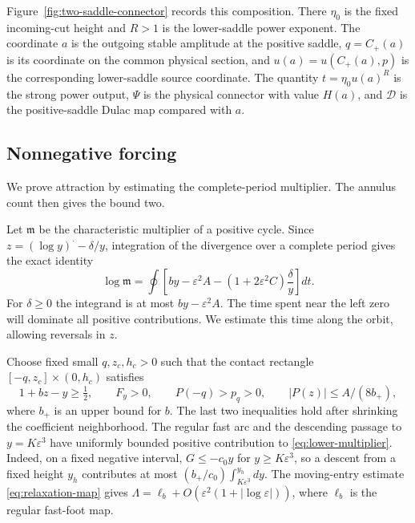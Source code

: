 Figure~\ref{fig:two-saddle-connector} records this composition.
There $\eta_0$ is the fixed incoming-cut height and $R>1$ is the lower-saddle
power exponent. The coordinate $a$ is the outgoing stable amplitude at the
positive saddle, $q=C_+(a)$ is its coordinate on the common physical section,
and $u(a)=u(C_+(a),p)$ is the corresponding lower-saddle source coordinate.
The quantity $t=\eta_0u(a)^R$ is the strong power output, $\Psi$ is the
physical connector with value $H(a)$, and $\mathcal D$ is the positive-saddle
Dulac map compared with $a$.



\subsection{Nonnegative forcing}

We prove attraction by estimating the complete-period multiplier.
The annulus count then gives the bound two.

Let $\mathfrak m$ be the characteristic multiplier of a positive cycle.
Since $z=(\log y)^{\boldsymbol\cdot}-\delta/y$, integration of the
divergence over a complete period gives the exact identity
\begin{equation}\label{eq:lower-multiplier}
 \log\mathfrak m
 =\oint\left[by-\varepsilon^2A
                  -(1+2\varepsilon^2C)\frac{\delta}{y}\right]dt.
\end{equation}
For $\delta\ge0$ the integrand is at most $by-\varepsilon^2A$.
The time spent near the left zero will dominate all positive contributions.
We estimate this time along the orbit, allowing reversals in $z$.

Choose fixed small $q,z_c,h_c>0$ such that the contact rectangle
$[-q,z_c]\times(0,h_c)$ satisfies
\begin{equation}\label{eq:lower-contact-box}
 1+bz-y\ge\tfrac12,\qquad F_y>0,\qquad P(-q)>p_q>0,
 \qquad |P(z)|\le A/(8b_+),
\end{equation}
where $b_+$ is an upper bound for $b$. The last two inequalities hold
after shrinking the coefficient neighborhood. The regular fast arc and
the descending passage to $y=K\varepsilon^3$ have uniformly bounded
positive contribution to \eqref{eq:lower-multiplier}. Indeed, on a fixed
negative interval, $G\le-c_0y$ for $y\ge K\varepsilon^3$, so a descent
from a fixed height $y_h$ contributes at most
$(b_+/c_0)\int_{K\varepsilon^3}^{y_h}dy$. The moving-entry estimate \eqref{eq:relaxation-map} gives
$\Lambda=\ell_b+O(\varepsilon^2(1+|\log\varepsilon|))$,
where $\ell_b$ is the regular fast-foot map.

